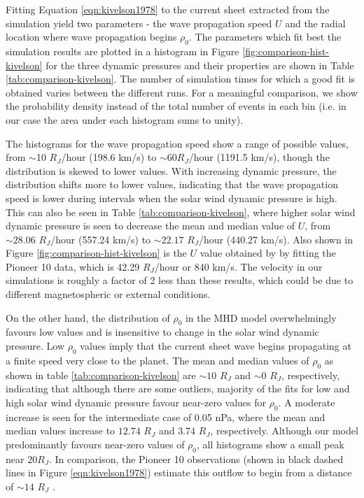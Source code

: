 Fitting Equation \ref{eqn:kivelson1978} to the current sheet extracted from the simulation yield two parameters - the wave propagation speed $U$ and the radial location where wave propagation begins $\rho_0$. The parameters which fit best the simulation results are plotted in a histogram in Figure 
\ref{fig:comparison-hist-kivelson} for the three dynamic pressures and their properties are shown in Table \ref{tab:comparison-kivelson}. The number of simulation times for which a good fit is obtained varies between the different runs. For a meaningful comparison, we show the probability density instead of the total number of events in each bin (i.e. in our case the area under each histogram sums to unity). 

The histograms for the wave propagation speed show a range of possible values, from $\sim$10 $R_J$/hour (198.6 km/s) to $\sim60 R_J$/hour (1191.5 km/s), though the distribution is skewed to lower values. With increasing dynamic pressure, the distribution shifts more to lower values, indicating that the wave propagation speed is lower during intervals when the solar wind dynamic pressure is high. This can also be seen in Table \ref{tab:comparison-kivelson}, where higher solar wind dynamic pressure is seen to decrease the mean and median value of $U$, from $\sim28.06$ $R_J$/hour (557.24 km/s) to $\sim22.17$ $R_J$/hour (440.27 km/s). Also shown in Figure \ref{fig:comparison-hist-kivelson} is the $U$ value obtained by  by fitting the Pioneer 10 data, which is 42.29 $R_J$/hour or 840 km/s. The velocity in our simulations is roughly a factor of 2 less than these results, which could be due to different magnetospheric or external conditions. 

On the other hand, the distribution of $\rho_0$ in the MHD model overwhelmingly favours low values and is insensitive to change in the solar wind dynamic pressure. Low $\rho_0$ values imply that the current sheet wave begins propagating at a finite speed very close to the planet. The mean and median values of $\rho_0$ as shown in table \ref{tab:comparison-kivelson} are $\sim10$ $R_J$ and $\sim 0$ $R_J$, respectively, indicating that although there are some outliers, majority of the fits for low and high solar wind dynamic pressure favour near-zero values for $\rho_0$. A moderate increase is seen for the intermediate case of 0.05 nPa, where the mean and median values increase to $12.74$ $R_J$ and $3.74$ $R_J$, respectively. Although our model predominantly favours near-zero values of $\rho_0$, all histograms show a small peak near $20R_J$. In comparison, the Pioneer 10 observations (shown in black dashed lines in Figure \ref{eqn:kivelson1978}) estimate this outflow to begin from a distance of $\sim14$ $R_J$ \cite{Kivelson1978ASheet}.  

